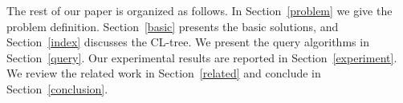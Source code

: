 The rest of our paper is organized as follows. In Section~\ref{problem} we give the problem definition.
Section~\ref{basic} presents the basic solutions, and Section~\ref{index} discusses the CL-tree. We present the query algorithms in Section~\ref{query}. Our experimental results are reported in Section~\ref{experiment}. We review the related work in Section~\ref{related}
and conclude in Section~\ref{conclusion}.
\fi 